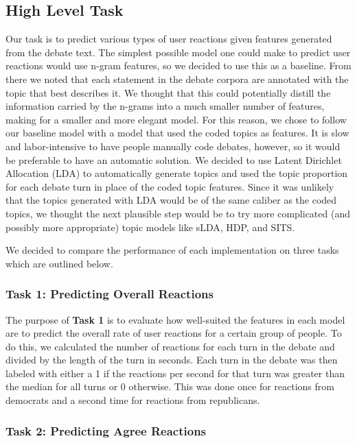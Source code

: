 
\subsection{High Level Task}

Our task is to predict various types of user reactions given features generated from the debate text.
The simplest possible model one could make to predict user reactions would use n-gram features, so we decided to use this as a baseline.
From there we noted that each statement in the debate corpora are annotated with the topic that best describes it.
We thought that this could potentially distill the information carried by the n-grams into a much smaller number of features, making for a smaller and more elegant model.
For this reason, we chose to follow our baseline model with a model that used the coded topics as features.
It is slow and labor-intensive to have people manually code debates, however, so it would be preferable to have an automatic solution.
We decided to use Latent Dirichlet Allocation (LDA) to automatically generate topics and used the topic proportion for each debate turn in place of the  coded topic features.
Since it was unlikely that the topics generated with LDA would be of the same caliber as the coded topics, we thought the next plausible step would be to try more complicated (and possibly more appropriate) topic models like sLDA, HDP, and SITS.

We decided to compare the performance of each implementation on three tasks which are outlined below.

\subsubsection{Task 1: Predicting Overall Reactions}

The purpose of \textbf{Task 1} is to evaluate how well-suited the features in each model are to predict the overall rate of user reactions for a certain group of people.
To do this, we calculated the number of reactions for each turn in the debate and divided by the length of the turn in seconds.
Each turn in the debate was then labeled with either a 1 if the reactions per second for that turn was greater than the median for all turns or 0 otherwise.
This was done once for reactions from democrats and a second time for reactions from republicans.

\subsubsection{Task 2: Predicting Agree Reactions}

